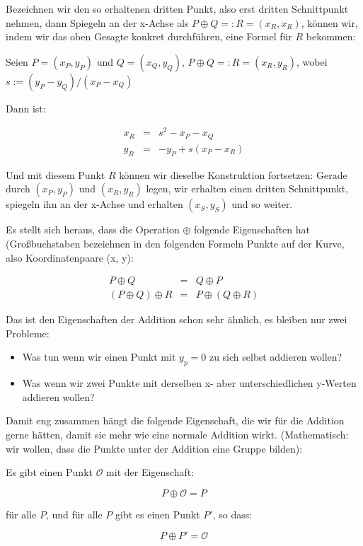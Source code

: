\documentclass{article}
\begin{document}
Bezeichnen wir den so erhaltenen dritten Punkt, also erst dritten Schnittpunkt
nehmen, dann Spiegeln an der x-Achse als $P \oplus Q =: R = (x_R, x_R)$,
können wir, indem wir das oben Gesagte konkret durchführen, eine Formel für $R$
bekommen:


Seien $P=(x_P, y_P)$ und $Q=(x_Q, y_Q)$, $P \oplus Q =: R = (x_R, y_R)$, wobei
$s := (y_P - y_Q) / (x_P - x_Q)$

Dann ist:

\begin{eqnarray*}
  x_R & = & s^2 - x_P - x_Q \\
  y_R & = & - y_P + s (x_P - x_R)
\end{eqnarray*}

Und mit diesem Punkt $R$ können wir dieselbe Konstruktion fortsetzen: Gerade
durch $(x_P, y_P)$ und $(x_R, y_R)$ legen, wir erhalten einen dritten
Schnittpunkt, spiegeln ihn an der x-Achse und erhalten $(x_S, y_S)$ und so
weiter.

Es stellt sich heraus, dass die Operation $\oplus$ folgende Eigenschaften hat
(Großbuchstaben bezeichnen in den folgenden Formeln Punkte auf der Kurve, also
Koordinatenpaare (x, y):

\begin{eqnarray*}
  P \oplus Q & = & Q \oplus P \\
  (P \oplus Q) \oplus R & = & P \oplus (Q \oplus R)
\end{eqnarray*}

Das ist den Eigenschaften der Addition schon sehr ähnlich, es bleiben nur zwei
Probleme:
\begin{itemize}
\item Was tun wenn wir einen Punkt mit $y_p = 0$ zu sich selbst addieren wollen?
\item Was wenn wir zwei Punkte mit derselben x- aber unterschiedlichen y-Werten
  addieren wollen?
\end{itemize}

Damit eng zusammen hängt die folgende Eigenschaft, die wir für die Addition
gerne hätten, damit sie mehr wie eine normale Addition wirkt. (Mathematisch:
wir wollen, dass die Punkte unter der Addition eine Gruppe bilden):

Es gibt einen Punkt $\mathcal{O}$ mit der Eigenschaft:

$$  P \oplus \mathcal{O} = P $$

für alle $P$, und für alle $P$ gibt es einen Punkt $P'$, so dass:

$$  P \oplus P' = \mathcal{O} $$
\end{document}

